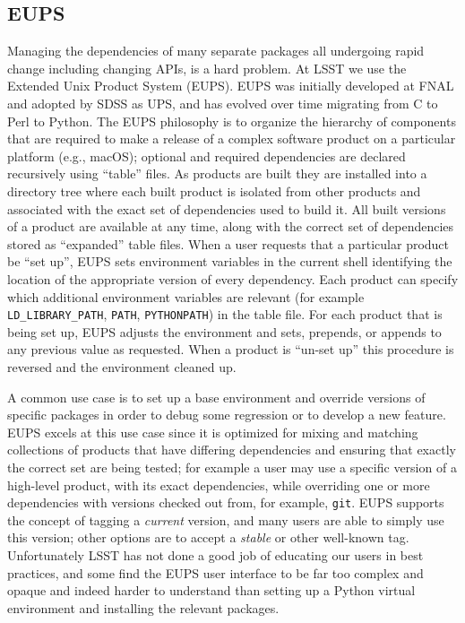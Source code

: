 \subsection{EUPS}\label{sec:eups}

Managing the dependencies of many separate packages all undergoing rapid change including changing APIs, is a hard problem.
At LSST we use the Extended Unix Product System (EUPS)\cite{EUPS}.
EUPS was initially developed at FNAL and adopted by SDSS as UPS, and has evolved over time migrating from C to Perl to Python.
The EUPS philosophy is to organize the hierarchy of components that are required to make a release of a complex software product on a particular platform (e.g., macOS); optional and required dependencies are declared recursively using ``table'' files.
As products are built they are installed into a directory tree where each built product is isolated from other products and associated with the exact set of dependencies used to build it.
All built versions of a product are available at any time, along with the correct set of dependencies stored as ``expanded'' table files.
When a user requests that a particular product be ``set up'', EUPS sets environment variables in the current shell identifying the location of the appropriate version of every dependency.
Each product can specify which additional environment variables are relevant (for example \texttt{LD\_LIBRARY\_PATH}, \texttt{PATH}, \texttt{PYTHONPATH}) in the table file.
For each product that is being set up, EUPS adjusts the environment and sets, prepends, or appends to any previous value as requested.
When a product is ``un-set up'' this procedure is reversed and the environment cleaned up.

A common use case is to set up a base environment and override versions of specific packages in order to debug some regression or to develop a new feature.
EUPS excels at this use case since it is optimized for mixing and matching collections of products that have differing dependencies and ensuring that exactly the correct set are being tested; for example a user may use a specific version of a high-level product, with its exact dependencies, while overriding one or more dependencies with versions checked out from, for example, \texttt{git}.
EUPS supports the concept of tagging a \emph{current} version, and many users are able to simply use this version; other options are to accept a \emph{stable} or other well-known tag.
Unfortunately LSST has not done a good job of educating our users in best practices, and some find the EUPS user interface to be far too complex and opaque and indeed harder to understand than setting up a Python virtual environment and installing the relevant packages.

